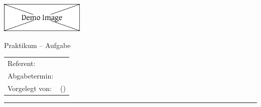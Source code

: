 \begin{flushright}
	\includegraphics[width=0.3\textwidth]{images/hfu_logo.eps}
\end{flushright}

\begin{center}
	{
		\Large\selectfont
		\setlength\parskip{0.5\parskip}
		
		\metadataCourse
		
		Praktikum -- Aufgabe \metadataExNo
	}
	
	\vspace{5mm}
	
	\begin{tabular}{ll}
		Referent: & \metadataConsultant \\
		Abgabetermin: & \metadataDeadline \\
		Vorgelegt von: & \metadataAuthor{} (\metadataMatriculationNumber{}) \\
	\end{tabular}
	
	\vspace{10mm}
	
	\hrule
\end{center}